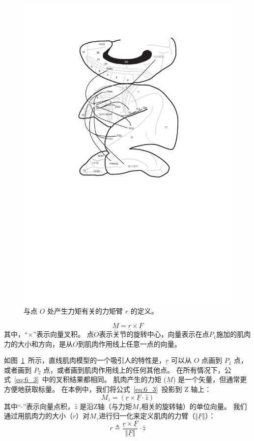 \begin{figure}[!htb]
	\centering
	\includegraphics[width=0.9\linewidth]{chap6/6_2}
	\caption{与点 $O$ 处产生力矩有关的力矩臂 $r$ 的定义。 \label{fig:6_2}}
\end{figure}


\begin{equation}
	\underline{M} = \underline{r} \times \underline{F}
	\label{eq:6_3}
\end{equation}
%
其中，“$\times$”表示向量叉积。
点$O$表示关节的旋转中心，向量表示在点$P_1$施加的肌肉力的大小和方向，是从$O$到肌肉作用线上任意一点的向量。


如图~\ref{fig:6_2}~所示，直线肌肉模型的一个吸引人的特性是，$\underline{r}$ 可以从 $O$ 点画到 $P_1$ 点，或者画到 $P_2$ 点，或者画到肌肉作用线上的任何其他点。
在所有情况下，公式~\ref{eq:6_3}~中的叉积结果都相同。
肌肉产生的力矩 ($\underline{M}$) 是一个矢量，但通常更方便地获取标量。
在本例中，我们将公式~\ref{eq:6_3}~投影到 Z 轴上：
%
\begin{equation}
	M_z = ( \underline{r} \times \underline{F} \cdot \hat{z} )
	\label{eq:6_4}
\end{equation}
%
其中“$\cdot$”表示向量点积，$\hat{z}$ 是沿Z轴（与力矩$M_z$相关的旋转轴）的单位向量。
我们通过用肌肉力的大小（$r$）对$M_z$进行归一化来定义肌肉的力臂（$ \Vert \underline{F} \Vert $）：
%
\begin{equation}
	r \triangleq 
		\frac{
			\underline{r} \times \underline{F}
		}{
			\Vert \underline{F} \Vert
		}
		\cdot
		\hat{z}
	\label{eq:6_5}
\end{equation}


